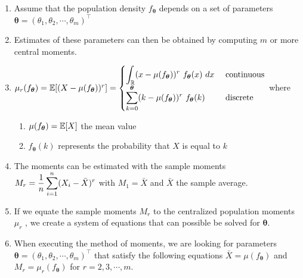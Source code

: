 \begin{enumerate}
    \item Assume that the population density $f_{\bm{\theta} }$ depends on a set of parameters $\bm{\theta}  = (\theta _1, \theta _2, \cdots , \theta _m )^\top$
    \hfill \cite{statistics/book/Statistics-for-Data-Scientists/Maurits-Kaptein}

    \item Estimates of these parameters can then be obtained by computing $m$ or more central moments.
    \hfill \cite{statistics/book/Statistics-for-Data-Scientists/Maurits-Kaptein}

    \item
    $
        \mu_r ( f_{\bm{\theta}} )
        = \mbbE [(X - \mu ( f_{\bm{\theta}} ))^r ]
        =
        \begin{cases}
            \dint _{\mbbR} (x - \mu ( f_{\bm{\theta}} ))^r\ f_{\bm{\theta}} (x)\ dx & \text{ continuous} \\
            \dsum _{k=0}^{\bm{\theta}} (k - \mu ( f_{\bm{\theta}} ))^r\ f_{\bm{\theta}} (k) & \text{ discrete} \\
        \end{cases}
    $
    where
    \hfill \cite{statistics/book/Statistics-for-Data-Scientists/Maurits-Kaptein}
    \begin{enumerate}
        \item  $\mu( f_{\bm{\theta}} ) = \mathbb{E}[X]$ the mean value
        \hfill \cite{statistics/book/Statistics-for-Data-Scientists/Maurits-Kaptein}

        \item $f_{\bm{\theta}} (k)$ represents the probability that $X$ is equal to $k$
        \hfill \cite{statistics/book/Statistics-for-Data-Scientists/Maurits-Kaptein}
    \end{enumerate}

    \item The moments can be estimated with the sample moments $M_r = \dfrac{1}{n} \displaystyle\sum^n _{i=1} (X_ i - \bar{X} )^r$ with $M_1 = \bar{X}$ and $\bar{X}$ the sample average.
    \hfill \cite{statistics/book/Statistics-for-Data-Scientists/Maurits-Kaptein}

    \item If we equate the sample moments $M_r$ to the centralized population moments $\mu_r$ , we create a system of equations that can possible be solved for $\bm{\theta}$.
    \hfill \cite{statistics/book/Statistics-for-Data-Scientists/Maurits-Kaptein}

    \item When executing the method of moments, we are looking for parameters $\bm{\theta } = (\theta _1, \theta _2, \cdots , \theta _m )^\top$ that satisfy the following equations $\bar{X} = \mu ( f_{\bm{\theta}}  )$ and $M_r = \mu_r ( f_{\bm{\theta}}  )$ for $r = 2, 3, \cdots , m$.
    \hfill \cite{statistics/book/Statistics-for-Data-Scientists/Maurits-Kaptein}


\end{enumerate}
